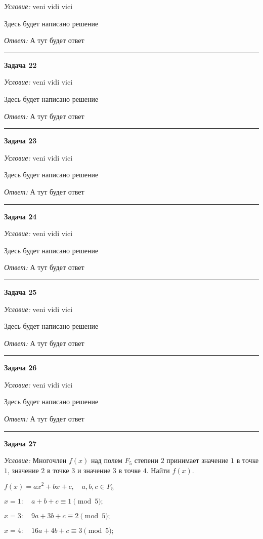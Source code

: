 \documentclass[12pt,a4paper]{article}
\newcommand{\sbs}{\large \bfseries}
\newcommand{\rl}{\vspace{16pt} \hrule \vspace{8pt}}
\begin{document}
{\itshape Условие: } veni vidi vici

Здесь будет написано решение

{\itshape Ответ: } А тут будет ответ




\rl
{\sbs Задача 22}

{\itshape Условие: } veni vidi vici

Здесь будет написано решение

{\itshape Ответ: } А тут будет ответ




\rl
{\sbs Задача 23}

{\itshape Условие: } veni vidi vici

Здесь будет написано решение

{\itshape Ответ: } А тут будет ответ




\rl
{\sbs Задача 24}

{\itshape Условие: } veni vidi vici

Здесь будет написано решение

{\itshape Ответ: } А тут будет ответ




\rl
{\sbs Задача 25}

{\itshape Условие: } veni vidi vici

Здесь будет написано решение

{\itshape Ответ: } А тут будет ответ




\rl
{\sbs Задача 26}

{\itshape Условие: } veni vidi vici

Здесь будет написано решение

{\itshape Ответ: } А тут будет ответ




\rl
{\sbs Задача 27}

{\itshape Условие: } Многочлен $f(x)$ над полем  $F_5$ степени  $2$ принимает значение $1$ в точке $1$, значение $2$ в точке $3$ и значение $3$ в точке $4$. Найти $f(x)$.

$f(x)=ax^2+bx+c, \quad a, b ,c \in F_5$

$x=1 \colon \quad a+b+c  \equiv 1\pmod{5};$

$x=3 \colon \quad 9a+3b+c  \equiv 2\pmod{5};$

$x=4 \colon \quad 16a+4b+c \equiv 3\pmod{5};$
\end{document}

